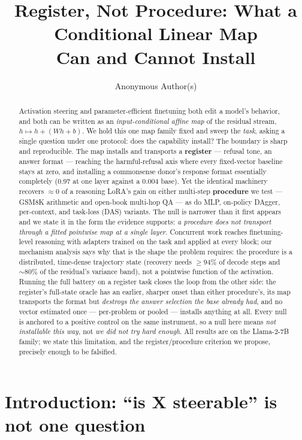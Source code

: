 \documentclass{article}
\title{Register, Not Procedure: What a Conditional Linear Map\\Can and Cannot Install}
\author{%
  Anonymous Author(s)
}
\begin{document}
\maketitle

\begin{abstract}
Activation steering and parameter-efficient finetuning both edit a model's behavior, and both can be
written as an \emph{input-conditional affine map} of the residual stream, $h \mapsto h + (Wh+b)$.
We hold this one map family fixed and sweep the \emph{task}, asking a single question under one
protocol: does the capability install? The boundary is sharp and reproducible. The map installs and
transports a \textbf{register} --- refusal tone, an answer format --- reaching the harmful-refusal
axis where every fixed-vector baseline stays at zero, and installing a commonsense donor's response
format essentially completely ($0.97$ at one layer against a $0.004$ base). Yet the identical
machinery recovers ${\approx}0$ of a reasoning LoRA's gain on either multi-step \textbf{procedure}
we test --- GSM8K arithmetic and open-book multi-hop QA --- as do MLP, on-policy DAgger,
per-context, and task-loss (DAS) variants. The null is narrower than it first appears and we state
it in the form the evidence supports: \emph{a procedure does not transport through a fitted
pointwise map at a single layer}. Concurrent work reaches finetuning-level reasoning with adapters
trained on the task and applied at every block; our mechanism analysis says why that is the shape
the problem requires: the procedure is a distributed, time-dense trajectory state (recovery needs
${\geq}94\%$ of decode steps and ${\sim}80\%$ of the residual's variance band), not a pointwise
function of the activation. Running the full battery on a register task closes the loop from the
other side: the register's full-state oracle has an earlier, sharper onset than either procedure's,
its map transports the format but \emph{destroys the answer selection the base already had}, and no
vector estimated once --- per-problem or pooled --- installs anything at all. Every null is anchored
to a positive control on the same instrument, so a null here means \emph{not installable this way},
not \emph{we did not try hard enough}. All results are on the Llama-2-7B family; we state this
limitation, and the register/procedure criterion we propose, precisely enough to be falsified.
\end{abstract}

\section{Introduction: ``is X steerable'' is not one question}
\label{sec:intro}
\end{document}
